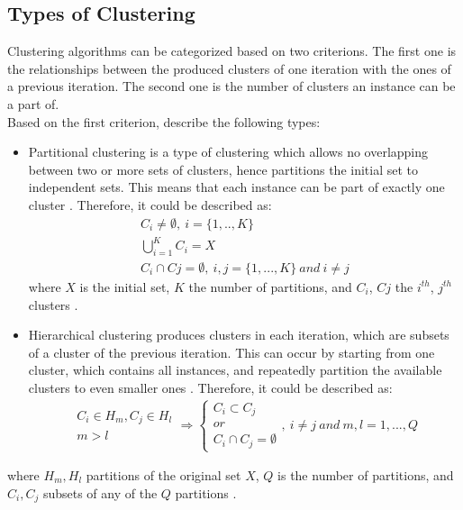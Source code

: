 \subsection{Types of Clustering}
Clustering algorithms can be categorized based on two criterions. The first one is the relationships between the produced clusters of one iteration with the ones of a previous iteration. The second one is the number of clusters an instance can be a part of. \\
Based on the first criterion, \textcite{tanSteinKum} describe the following types: \\
\begin{itemize}
\item Partitional clustering is a type of clustering which allows no overlapping between two or more sets of clusters, hence partitions the initial set to independent sets. This means that each instance can be part of exactly one cluster \autocite[492]{tanSteinKum}. Therefore, it could be described as:
\begin{eqnarray*}
C_{i} \neq \emptyset, \: i = \{1,..,K\} \\
\bigcup_{i=1}^{K} C_{i}=X \\
C_{i} \cap C{j} = \emptyset, \: i,j=\{1, ...,K\} \: and \: i \neq j
\end{eqnarray*}
where \(X\) is the initial set, \(K\) the number of partitions, and \(C_{i}\), \(C{j}\) the \(i^{th}\), \(j^{th}\) clusters \autocite[645]{survey}.
\item Hierarchical clustering produces clusters in each iteration, which are subsets of a cluster of the previous iteration. This can occur by starting from one cluster, which contains all instances, and repeatedly partition the available clusters to even smaller ones \autocite[492]{tanSteinKum}. Therefore, it could be described as:
\begin{eqnarray*}
\left.\begin{array}{c}
C_{i} \in H_{m}, C_{j} \in H_{l} \\
m>l
\end{array}\right. \Rightarrow
\left\{\begin{array}{c}
C_{i} \subset C_{j} \\
or \\
C_{i} \cap C_{j} = \emptyset
\end{array}\right.
, \: i \neq j \: and \: m,l = 1, ...,Q
\end{eqnarray*}
\end{itemize}
where \(H_{m}, H_{l}\) partitions of the original set \(X\), \(Q\) is the number of partitions, and \(C_{i}, C_{j}\) subsets of any of the \(Q\) partitions \autocite[646]{survey}. \\
